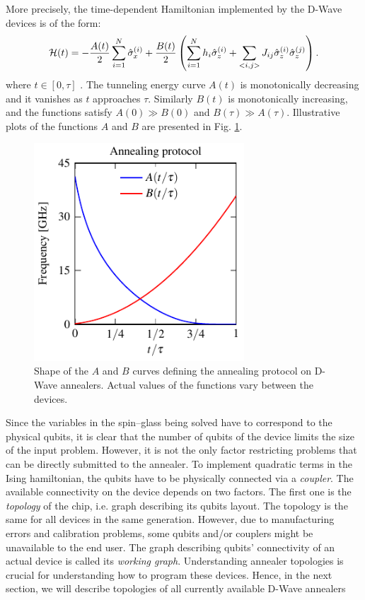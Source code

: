 More precisely, the time-dependent Hamiltonian implemented by the D-Wave
devices is of the form:
\begin{equation}
  \label{eq:dwaveham}
  \mathcal{H}(t) =  -\frac{A(t)}{2}\sum_{i=1}^N \hat{\sigma}^{(i)}_x + \frac{B(t)}{2}\left(\sum_{i=1}^N h_i \hat{\sigma}^{(i)}_z + \sum_{<i, j>} J_{ij} \hat{\sigma}^{(i)}_z \hat{\sigma}^{(j)}_z\right).
\end{equation}
where $t \in [0, \tau]$ \cite{dwavedocs}. The tunneling energy curve $A(t)$ is
monotonically decreasing and it vanishes as $t$ approaches $\tau$. Similarly
$B(t)$ is monotonically increasing, and the functions satisfy $A(0) \gg B(0)$
and $B(\tau) \gg A(\tau)$. Illustrative plots of the functions $A$ and $B$ are presented in Fig. \ref{fig:annealingfuncs}.

\begin{figure}
  \centering
  \includegraphics[width=0.7\textwidth]{figures/quench}
  \caption{Shape of the $A$ and $B$ curves defining the annealing protocol on D-Wave annealers.
    Actual values of the functions vary between the devices.
  }
  \label{fig:annealingfuncs}
\end{figure}



Since the variables in the spin--glass being solved have to correspond to the
physical qubits, it is clear that the number of qubits of the device limits the
size of the input problem. However, it is not the only factor restricting
problems that can be directly submitted to the annealer. To implement quadratic
terms in the Ising hamiltonian, the qubits have to be physically connected via
a \emph{coupler}. The available connectivity on the device depends on two
factors. The first one is the \emph{topology} of the chip, i.e. graph
describing its qubits layout. The topology is the same for all devices in the
same generation. However, due to manufacturing errors and calibration problems,
some qubits and/or couplers might be unavailable to the end user. The graph
describing qubits' connectivity of an actual device is called its \emph{working
  graph}. Understanding annealer topologies is crucial for understanding how to
program these devices. Hence, in the next section, we will describe topologies
of all currently available D-Wave annealers

